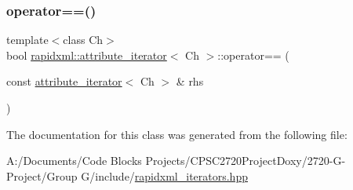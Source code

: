 \subsubsection{\texorpdfstring{operator==()}{operator==()}\hspace{0.1cm}{\footnotesize\ttfamily [2/2]}}
{\footnotesize\ttfamily template$<$class Ch$>$ \\
bool \mbox{\hyperlink{classrapidxml_1_1attribute__iterator}{rapidxml\+::attribute\+\_\+iterator}}$<$ Ch $>$\+::operator== (\begin{DoxyParamCaption}\item[{const \mbox{\hyperlink{classrapidxml_1_1attribute__iterator}{attribute\+\_\+iterator}}$<$ Ch $>$ \&}]{rhs }\end{DoxyParamCaption})\hspace{0.3cm}{\ttfamily [inline]}}



The documentation for this class was generated from the following file\+:\begin{DoxyCompactItemize}
\item 
A\+:/\+Documents/\+Code Blocks Projects/\+C\+P\+S\+C2720\+Project\+Doxy/2720-\/\+G-\/\+Project/\+Group G/include/\mbox{\hyperlink{include_2rapidxml__iterators_8hpp}{rapidxml\+\_\+iterators.\+hpp}}\end{DoxyCompactItemize}
